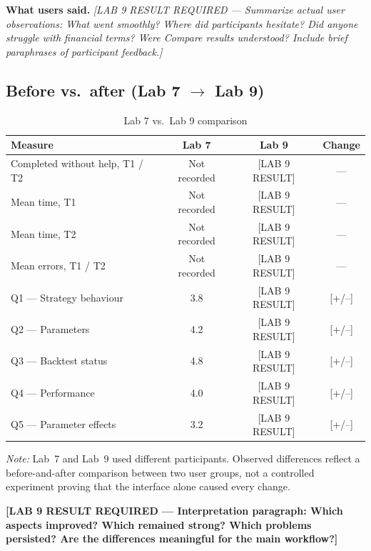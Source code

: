 \documentclass[10pt,a4paper]{article}
\begin{document}
\textbf{What users said.}
\emph{[LAB 9 RESULT REQUIRED --- Summarize actual user observations: What went smoothly? Where did participants hesitate? Did anyone struggle with financial terms? Were Compare results understood? Include brief paraphrases of participant feedback.]}

\subsection{Before vs.\ after (Lab 7 $\to$ Lab 9)}

\begin{table}[H]
\centering
\caption{Lab 7 vs.\ Lab 9 comparison}
\label{tab:comparison}
\begin{tabularx}{\textwidth}{X c c c}
\toprule
\textbf{Measure} & \textbf{Lab 7} & \textbf{Lab 9} & \textbf{Change} \\
\midrule
Completed without help, T1 / T2 &
  Not recorded &
  [LAB 9 RESULT] &
  --- \\
Mean time, T1 &
  Not recorded &
  [LAB 9 RESULT] &
  --- \\
Mean time, T2 &
  Not recorded &
  [LAB 9 RESULT] &
  --- \\
Mean errors, T1 / T2 &
  Not recorded &
  [LAB 9 RESULT] &
  --- \\
Q1 --- Strategy behaviour &
  3.8 &
  [LAB 9 RESULT] &
  [+/--] \\
Q2 --- Parameters &
  4.2 &
  [LAB 9 RESULT] &
  [+/--] \\
Q3 --- Backtest status &
  4.8 &
  [LAB 9 RESULT] &
  [+/--] \\
Q4 --- Performance &
  4.0 &
  [LAB 9 RESULT] &
  [+/--] \\
Q5 --- Parameter effects &
  3.2 &
  [LAB 9 RESULT] &
  [+/--] \\
\bottomrule
\end{tabularx}
\end{table}

\emph{Note:} Lab~7 and Lab~9 used different participants. Observed differences reflect a before-and-after comparison between two user groups, not a controlled experiment proving that the interface alone caused every change.

\textbf{[LAB 9 RESULT REQUIRED --- Interpretation paragraph: Which aspects improved? Which remained strong? Which problems persisted? Are the differences meaningful for the main workflow?]}
\end{document}

